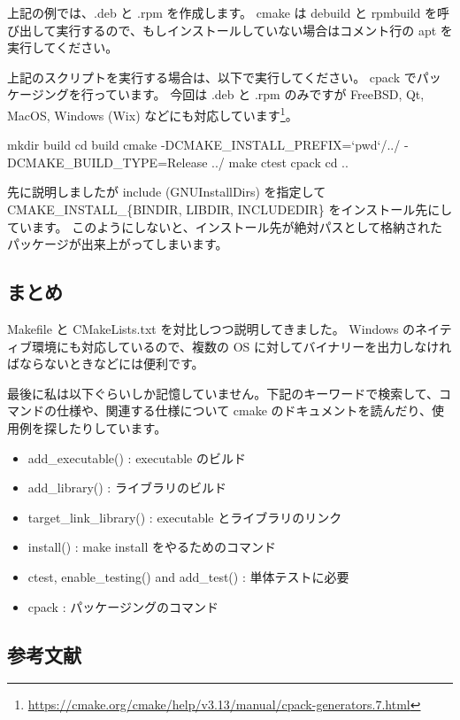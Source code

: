 \documentclass[mingoth,a4paper]{jsarticle}
\begin{document}
上記の例では、.deb と .rpm を作成します。
cmake は debuild と rpmbuild を呼び出して実行するので、もしインストールしていない場合はコメント行の apt を実行してください。

上記のスクリプトを実行する場合は、以下で実行してください。
cpack でパッケージングを行っています。
今回は .deb と .rpm のみですが FreeBSD, Qt, MacOS, Windows (Wix) などにも対応しています\footnote{\url{https://cmake.org/cmake/help/v3.13/manual/cpack-generators.7.html}}。

\begin{commandline}
mkdir build
cd build
cmake -DCMAKE_INSTALL_PREFIX=`pwd`/../  -DCMAKE_BUILD_TYPE=Release ../
make
ctest
cpack
cd ..
\end{commandline}

先に説明しましたが include (GNUInstallDirs) を指定して CMAKE\_INSTALL\_\{BINDIR, LIBDIR, INCLUDEDIR\} をインストール先にしています。
このようにしないと、インストール先が絶対パスとして格納されたパッケージが出来上がってしまいます。

\subsection{まとめ}

Makefile と CMakeLists.txt を対比しつつ説明してきました。
Windows のネイティブ環境にも対応しているので、複数の OS に対してバイナリーを出力しなければならないときなどには便利です。

最後に私は以下ぐらいしか記憶していません。下記のキーワードで検索して、コマンドの仕様や、関連する仕様について cmake のドキュメントを読んだり、使用例を探したりしています。
\begin{itemize}
  \item{add\_executable() : executable のビルド}
  \item{add\_library() : ライブラリのビルド}
  \item{target\_link\_library() : executable とライブラリのリンク}
  \item{install() : make install をやるためのコマンド}
  \item{ctest, enable\_testing() and add\_test() : 単体テストに必要}
  \item{cpack : パッケージングのコマンド}
\end{itemize}

\subsection{参考文献}
\end{document}
